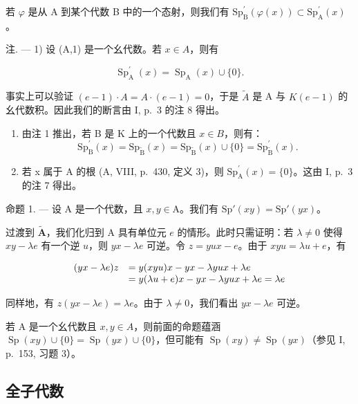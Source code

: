 若 \(\varphi\) 是从 A 到某个代数 B 中的一个态射，则我们有 \(\mathrm{Sp}_{\mathrm{B}}^{\prime}(\varphi(x)) \subset \mathrm{Sp}_{\mathrm{A}}^{\prime}(x)\)。

注. --- 1) 设 (A,1) 是一个幺代数。若 \(x \in A\)，则有

\[
\operatorname{Sp} _ {\mathrm{A}} ^ {\prime} (x) = \operatorname{Sp} _ {\mathrm{A}} (x) \cup \{0 \}.
\]

事实上可以验证 \((e-1) \cdot A = A \cdot (e-1) = 0\)，于是 \(\widetilde{A}\) 是 A 与 \(K(e-1)\) 的幺代数积。因此我们的断言由 I, p.~3 的注 8 得出。

\begin{enumerate}
\def\labelenumi{\arabic{enumi})}
\setcounter{enumi}{1}
\tightlist
\item
  由注 1 推出，若 B 是 K 上的一个代数且 \(x \in B\)，则有：
\[
\mathrm{Sp} _ {\mathrm{B}} ^ {\prime} (x) = \mathrm{Sp} _ {\widetilde {\mathrm{B}}} (x) = \mathrm{Sp} _ {\widetilde {\mathrm{B}}} (x) \cup \{0 \} = \mathrm{Sp} _ {\widetilde {\mathrm{B}}} ^ {\prime} (x).
\]

\item
  若 x 属于 A 的根 (A, VIII, p.~430, 定义 3)，则 \(\mathrm{Sp}_{\mathrm{A}}^{\prime}(x)=\{0\}\)。这由 I, p.~3 的注 7 得出。
\end{enumerate}

命题 1. --- 设 A 是一个代数，且 \(x, y \in \mathrm{A}\)。我们有 \(\mathrm{Sp}'(xy) = \mathrm{Sp}'(yx)\)。

过渡到 \(\widetilde{\mathbf{A}}\)，我们化归到 A 具有单位元 \(e\) 的情形。此时只需证明：若 \(\lambda \neq 0\) 使得 \(xy - \lambda e\) 有一个逆 \(u\)，则 \(yx - \lambda e\) 可逆。令 \(z = yux - e\)。由于 \(xyu = \lambda u + e\)，有

\[
\begin{array}{r l} (y x - \lambda e) z & = y (x y u) x - y x - \lambda y u x + \lambda e \\ & = y (\lambda u + e) x - y x - \lambda y u x + \lambda e = \lambda e \end{array}
\]

同样地，有 \(z(yx - \lambda e) = \lambda e\)。由于 \(\lambda \neq 0\)，我们看出 \(yx - \lambda e\) 可逆。

若 A 是一个幺代数且 \(x, y \in A\)，则前面的命题蕴涵 \(\operatorname{Sp}(xy) \cup \{0\} = \operatorname{Sp}(yx) \cup \{0\}\)，但可能有 \(\operatorname{Sp}(xy) \neq \operatorname{Sp}(yx)\)（参见 I, p.~153, 习题 3）。

\subsection{全子代数}

